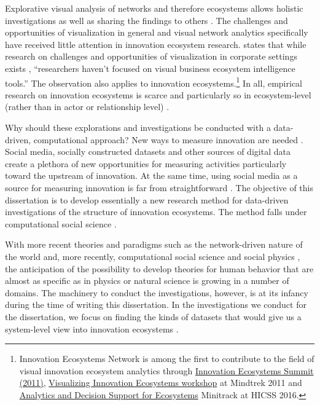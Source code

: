 Explorative visual analysis of networks and therefore ecosystems allows holistic investigations as well as sharing the findings to others \citep{Freeman2000VisualizingNetworks}. The challenges and opportunities of visualization in general and  visual network analytics specifically have received little attention in innovation ecosystem research. \cite{Basole2014} states that while research on challenges and opportunities of visualization in corporate settings exists \citep{Lam2012,Sedlmair2011}, ``researchers haven’t focused on visual business ecosystem intelligence tools.'' The observation also applies to innovation ecosystems.\footnote{Innovation Ecosystems Network is among the first to contribute to the field of visual innovation ecosystem analytics through \href{http://www.innovation-ecosystems.org/2011/05/31/ies2011/}{Innovation Ecosystems Summit (2011)}, \href{http://www.tut.fi/iislab/fi/2011/09/23/visualizing-innovation-ecosystems-mindtrek-2011/}{Visualizing Innovation Ecosystems workshop} at Mindtrek 2011 and \href{https://ien.stanford.edu/hicss2016}{Analytics and Decision Support for Ecosystems} Minitrack at HICSS 2016.} In all, empirical research on innovation ecosystems is scarce and particularly so in ecosystem-level (rather than in actor or relationship level) \citep{Jarvi2016TakingReview}.

Why should these explorations and investigations be conducted with a data-driven, computational approach? New ways to measure innovation are needed \citep{Still2012ParadigmDigital}. Social media, socially constructed datasets and other sources of digital data create a plethora of new opportunities for measuring activities particularly toward the upstream of innovation. At the same time, using social media as a source for measuring innovation is far from straightforward \citep{Salonen2013ChallengesMedia}. The objective of this dissertation is to develop essentially a new research method for data-driven investigations of the structure of innovation ecosystems. The method falls under computational social science \citep{Lazer2009ComputationalScience}.

With more recent theories and paradigms such as the network-driven nature of the world \citep{Watts1999, Barabasi2003} and, more recently, computational social science \citep{Lazer2009ComputationalScience} and social physics \citep{Pentland2015}, the anticipation of the possibility to develop theories for human behavior that are almost as specific as in physics or natural science is growing in a number of domains. The machinery to conduct the investigations, however, is at its infancy during the time of writing this dissertation. In the investigations we conduct for the dissertation, we focus on finding the kinds of datasets that would give us a system-level view into innovation ecosystems \citep[cf.][]{Pan2012}.

